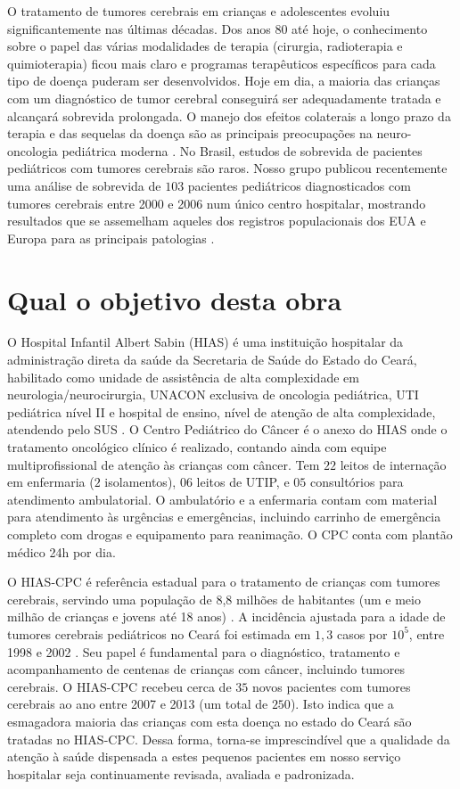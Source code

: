 \documentclass[11pt,a4paper,oldfontcommands]{memoir}
\begin{document}
O tratamento de tumores cerebrais em crianças e adolescentes evoluiu significantemente nas últimas décadas. Dos anos 80 até hoje, o conhecimento sobre o papel das várias modalidades de terapia (cirurgia, radioterapia e quimioterapia) ficou mais claro e programas terapêuticos específicos para cada tipo de doença puderam ser desenvolvidos. Hoje em dia, a maioria das crianças com um diagnóstico de tumor cerebral conseguirá ser adequadamente tratada e alcançará sobrevida prolongada. O manejo dos efeitos colaterais a longo prazo da terapia e das sequelas da doença são as principais preocupações na neuro-oncologia pediátrica moderna \cite{merchant}. No Brasil, estudos de sobrevida de pacientes pediátricos com tumores cerebrais são raros. Nosso grupo publicou recentemente uma análise de sobrevida de \(103\) pacientes pediátricos diagnosticados com tumores cerebrais entre 2000 e 2006 num único centro hospitalar, mostrando resultados que se assemelham aqueles dos registros populacionais dos EUA e Europa para as principais patologias \cite{araujo}.

\section{Qual o objetivo desta obra}

O Hospital Infantil Albert Sabin (HIAS) é uma instituição hospitalar da administração direta da saúde da Secretaria de Saúde do Estado do Ceará, habilitado como unidade de assistência de alta complexidade em neurologia/neurocirurgia, UNACON exclusiva de oncologia pediátrica, UTI pediátrica nível II e hospital de ensino, nível de atenção de alta complexidade, atendendo pelo SUS \cite{cnes}. O Centro Pediátrico do Câncer é o anexo do HIAS onde o tratamento oncológico clínico é realizado, contando ainda com equipe multiprofissional de atenção às crianças com câncer. Tem \(22\) leitos de internação em enfermaria (\(2\) isolamentos), \(06\) leitos de UTIP, e \(05\) consultórios para atendimento ambulatorial. O ambulatório e a enfermaria contam com material para atendimento às urgências e emergências, incluindo carrinho de emergência completo com drogas e equipamento para reanimação. O CPC conta com plantão médico 24h por dia.

O HIAS-CPC é referência estadual para o tratamento de crianças com tumores cerebrais, servindo uma população de 8,8 milhões de habitantes (um e meio milhão de crianças e jovens até 18 anos) \cite{estat}. A incidência ajustada para a idade de tumores cerebrais pediátricos no Ceará foi estimada em \(1,3\) casos por \(10^5\), entre 1998 e 2002 \cite{inca}. Seu papel é fundamental para o diagnóstico, tratamento e acompanhamento de centenas de crianças com câncer, incluindo tumores cerebrais. O HIAS-CPC recebeu cerca de \(35\) novos pacientes com tumores cerebrais ao ano entre 2007 e 2013 (um total de \(250\)). Isto indica que a esmagadora maioria das crianças com esta doença no estado do Ceará são tratadas no HIAS-CPC. Dessa forma, torna-se imprescindível que a qualidade da atenção à saúde dispensada a estes pequenos pacientes em nosso serviço hospitalar seja continuamente revisada, avaliada e padronizada.
\end{document}
